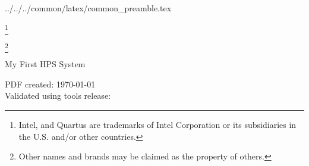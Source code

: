 %
%
%
%
%

\newcommand{\repoTopPath}{../../..}
\newcommand{\commonPreamblePath}{\repoTopPath/common/latex/common_preamble.tex}
 \commonPreamblePath


\sffamily

\begin{center}
\let\savethefootnote\thefootnote
\let\thefootnote\relax\footnote{Intel, and Quartus are trademarks of Intel Corporation or its subsidiaries in the U.S. and/or other countries.}
\addtocounter{footnote}{-1}
\let\thefootnote\savethefootnote
\hspace{-1em}
\let\savethefootnote\thefootnote
\let\thefootnote\relax\footnote{Other names and brands may be claimed as the property of others.}
\addtocounter{footnote}{-1}
\let\thefootnote\savethefootnote
\hspace{-1em}
\LARGE{My First HPS System}\\[1em]
\end{center}

\begin{flushleft}
\normalsize{PDF created: \today}\\
\normalsize{Validated using tools release: \TheToolsReleaseVersion}
\end{flushleft}

